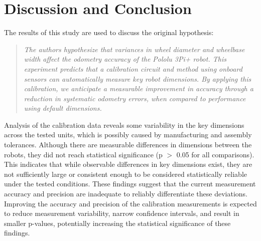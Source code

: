 \documentclass[conference]{IEEEtran}
\begin{document}
\section{Discussion and Conclusion}\label{sec:discussion_conclusion}

The results of this study are used to discuss the original hypothesis:


\begin{quote}
    \emph{
    The authors hypothesize that variances in wheel diameter and wheelbase width affect the odometry accuracy of the Pololu 3Pi+ robot.
    This experiment predicts that a calibration circuit and method using onboard sensors can automatically measure key robot dimensions.
    By applying this calibration, we anticipate a measurable improvement in accuracy through a reduction in systematic odometry errors, when compared to performance using default dimensions.
    }
\end{quote}

Analysis of the calibration data reveals some variability in the key dimensions across the tested units, which is possibly caused by manufacturing and assembly tolerances. 
Although there are measurable differences in dimensions between the robots, they did not reach statistical significance (p $>$ 0.05 for all comparisons). 
This indicates that while observable differences in key dimensions exist, they are not sufficiently large or consistent enough to be considered statistically reliable under the tested conditions.
These findings suggest that the current measurement accuracy and precision are inadequate to reliably differentiate these deviations. 
Improving the accuracy and precision of the calibration measurements is expected to reduce measurement variability, narrow confidence intervals, and result in smaller p-values, potentially increasing the statistical significance of these findings.
\end{document}
